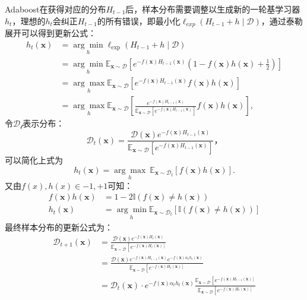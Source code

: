 {Adaboost在获得对应的分布$H_{t-1}$后，样本分布需要调整以生成新的一轮基学习器$h_t$，理想的$h_t$会纠正$H_{t-1}$的所有错误，即最小化$\ell_{exp}(H_{t-1}+h\mid \mathcal{D})$，通过泰勒展开可以得到更新公式：
\[
\begin{aligned} h_{t}(\boldsymbol{x}) & =\underset{h}{\arg \min } \ell_{\exp }\left(H_{t-1}+h \mid \mathcal{D}\right) \\ & =\underset{h}{\arg \min } \mathbb{E}_{\boldsymbol{x} \sim \mathcal{D}}\left[e^{-f(\boldsymbol{x}) H_{t-1}(\boldsymbol{x})}\left(1-f(\boldsymbol{x}) h(\boldsymbol{x})+\frac{1}{2}\right)\right] \\ & =\underset{h}{\arg \max } \mathbb{E}_{\boldsymbol{x} \sim \mathcal{D}}\left[e^{-f(\boldsymbol{x}) H_{t-1}(\boldsymbol{x})} f(\boldsymbol{x}) h(\boldsymbol{x})\right] \\ & =\underset{h}{\arg \max } \mathbb{E}_{\boldsymbol{x} \sim \mathcal{D}}\left[\frac{e^{-f(\boldsymbol{x}) H_{t-1}(\boldsymbol{x})}}{\mathbb{E}_{\boldsymbol{x} \sim \mathcal{D}}\left[e^{-f(\boldsymbol{x}) H_{t-1}(\boldsymbol{x})}\right]} f(\boldsymbol{x}) h(\boldsymbol{x})\right],\end{aligned}
\]令$\mathcal{D_t}$表示分布：\[
\mathcal{D}_{t}(\boldsymbol{x})=\frac{\mathcal{D}(\boldsymbol{x}) e^{-f(\boldsymbol{x}) H_{t-1}(\boldsymbol{x})}}{\mathbb{E}_{\boldsymbol{x} \sim \mathcal{D}}\left[e^{-f(\boldsymbol{x}) H_{t-1}(\boldsymbol{x})}\right]}，
\]可以简化上式为\[
h_{t}(\boldsymbol{x})   =\underset{h}{\arg \max }\  \mathbb{E}_{\boldsymbol{x} \sim \mathcal{D}_{t}}[f(\boldsymbol{x}) h(\boldsymbol{x})] .
\]又由$f(x), h(x)\in{-1,+1}$可知：\[
\begin{aligned}
f(\boldsymbol{x}) h(\boldsymbol{x}) & =1-2 \mathbb{I}(f(\boldsymbol{x}) \neq h(\boldsymbol{x})) \\
h_{t}(\boldsymbol{x})&=\underset{h}{\arg \min } \mathbb{E}_{\boldsymbol{x} \sim \mathcal{D}_{t}}[\mathbb{I}(f(\boldsymbol{x}) \neq h(\boldsymbol{x}))]
\end{aligned}
\]
最终样本分布的更新公式为：
\[
\begin{aligned} \mathcal{D}_{t+1}(\boldsymbol{x}) & =\frac{\mathcal{D}(\boldsymbol{x}) e^{-f(\boldsymbol{x}) H_{t}(\boldsymbol{x})}}{\mathbb{E}_{\boldsymbol{x} \sim \mathcal{D}}\left[e^{\left.-f(\boldsymbol{x}) H_{t}(\boldsymbol{x})\right]}\right.} \\ & =\frac{\mathcal{D}(\boldsymbol{x}) e^{-f(\boldsymbol{x}) H_{t-1}(\boldsymbol{x})} e^{-f(\boldsymbol{x}) \alpha_{t} h_{t}(\boldsymbol{x})}}{\mathbb{E}_{\boldsymbol{x} \sim \mathcal{D}}\left[e^{\left.-f(\boldsymbol{x}) H_{t}(\boldsymbol{x})\right]}\right.} \\ & =\mathcal{D}_{t}(\boldsymbol{x}) \cdot e^{-f(\boldsymbol{x}) \alpha_{t} h_{t}(\boldsymbol{x})} \frac{\mathbb{E}_{\boldsymbol{x} \sim \mathcal{D}}\left[e^{\left.-f(\boldsymbol{x}) H_{t-1}(\boldsymbol{x})\right]}\right.}{\mathbb{E}_{\boldsymbol{x} \sim \mathcal{D}}\left[e^{\left.-f(\boldsymbol{x}) H_{t}(\boldsymbol{x})\right]}\right.}\end{aligned}
\]
}

